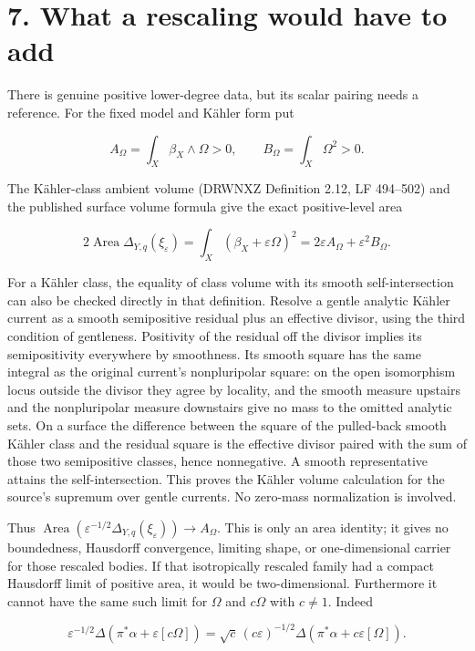 \documentclass[11pt]{article}
\begin{document}
\section*{7. What a rescaling would have to add}

There is genuine positive lower-\allowbreak{}degree data, but its scalar pairing needs a reference. For the fixed model and Kähler form put

\[A_\Omega=\int_X\beta_X\wedge\Omega>0,\qquad B_\Omega=\int_X\Omega^2>0.\]

The Kähler-\allowbreak{}class ambient volume (DRWNXZ Definition 2.12, LF 494–502) and the published surface volume formula give the exact positive-\allowbreak{}level area

\[2\operatorname{Area}\Delta_{Y,q}(\xi_\varepsilon)=\int_X(\beta_X+\varepsilon\Omega)^2=2\varepsilon A_\Omega+\varepsilon^2B_\Omega.\]

For a Kähler class, the equality of class volume with its smooth self-\allowbreak{}intersection can also be checked directly in that definition. Resolve a gentle analytic Kähler current as a smooth semipositive residual plus an effective divisor, using the third condition of gentleness. Positivity of the residual off the divisor implies its semipositivity everywhere by smoothness. Its smooth square has the same integral as the original current's nonpluripolar square: on the open isomorphism locus outside the divisor they agree by locality, and the smooth measure upstairs and the nonpluripolar measure downstairs give no mass to the omitted analytic sets. On a surface the difference between the square of the pulled-\allowbreak{}back smooth Kähler class and the residual square is the effective divisor paired with the sum of those two semipositive classes, hence nonnegative. A smooth representative attains the self-\allowbreak{}intersection. This proves the Kähler volume calculation for the source's supremum over gentle currents. No zero-\allowbreak{}mass normalization is involved.

Thus $\operatorname{Area}(\varepsilon^{-1/2}\Delta_{Y,q}(\xi_\varepsilon))\to A_\Omega$. This is only an area identity; it gives no boundedness, Hausdorff convergence, limiting shape, or one-\allowbreak{}dimensional carrier for those rescaled bodies. If that isotropically rescaled family had a compact Hausdorff limit of positive area, it would be two-\allowbreak{}dimensional. Furthermore it cannot have the same such limit for $\Omega$ and $c\Omega$ with $c\ne1$. Indeed

\[\varepsilon^{-1/2}\Delta(\pi^*\alpha+\varepsilon[c\Omega])=\sqrt c\,(c\varepsilon)^{-1/2}\Delta(\pi^*\alpha+c\varepsilon[\Omega]).\]
\end{document}
